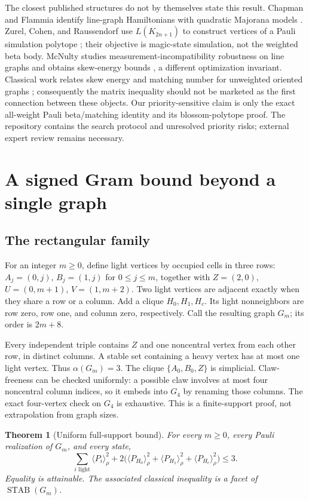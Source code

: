 \documentclass[11pt,a4paper]{article}
\newtheorem{theorem}{Theorem}[section]
\theoremstyle{remark}\newtheorem{remark}[theorem]{Remark}
\newcommand{\STAB}{\operatorname{STAB}}
\newcommand{\ev}[1]{\langle#1\rangle_\rho}
\begin{document}
The closest published structures do not by themselves state this result.
Chapman and Flammia identify line-graph Hamiltonians with quadratic
Majorana models \cite{cf}. Zurel, Cohen, and Raussendorf use
$L(K_{2n+1})$ to construct vertices of a Pauli simulation polytope
\cite{zurel}; their objective is magic-state simulation, not the weighted
beta body. McNulty studies measurement-incompatibility robustness on line
graphs and obtains skew-energy bounds \cite{mcnulty}, a different
optimization invariant. Classical work relates skew energy and matching
number for unweighted oriented graphs \cite{tianwong}; consequently the
matrix inequality should not be marketed as the first connection between
these objects. Our priority-sensitive claim is only the exact all-weight
Pauli beta/matching identity and its blossom-polytope proof. The repository
contains the search protocol and unresolved priority risks; external
expert review remains necessary.

\section{A signed Gram bound beyond a single graph}\label{sec:gram}
\subsection{The rectangular family}
For an integer $m\geq0$, define light vertices by occupied cells in
three rows: $A_j=(0,j)$, $B_j=(1,j)$ for $0\leq j\leq m$, together with
$Z=(2,0)$, $U=(0,m+1)$, $V=(1,m+2)$. Two light vertices are adjacent
exactly when they share a row or a column. Add a clique $H_0,H_1,H_c$.
Its light nonneighbors are row zero, row one, and column zero,
respectively. Call the resulting graph $G_m$; its order is $2m+8$.

Every independent triple contains $Z$ and one noncentral vertex from
each other row, in distinct columns. A stable set containing a heavy
vertex has at most one light vertex. Thus $\alpha(G_m)=3$.
The clique $\{A_0,B_0,Z\}$ is simplicial. Claw-freeness can be checked
uniformly: a possible claw involves at most four noncentral column
indices, so it embeds into $G_4$ by renaming those columns. The exact
four-vertex check on $G_4$ is exhaustive. This is a finite-support proof,
not extrapolation from graph sizes.

\begin{theorem}[Uniform full-support bound]\label{thm:full}
For every $m\geq0$, every Pauli realization of $G_m$, and every state,
\begin{equation}\label{eq:full}
 \sum_{i\text{ light}}\ev{P_i}^2
 +2\big(\ev{P_{H_0}}^2+\ev{P_{H_1}}^2+\ev{P_{H_c}}^2\big)\leq3.
\end{equation}
Equality is attainable. The associated classical inequality is a facet
of $\STAB(G_m)$.
\end{theorem}
\end{document}
